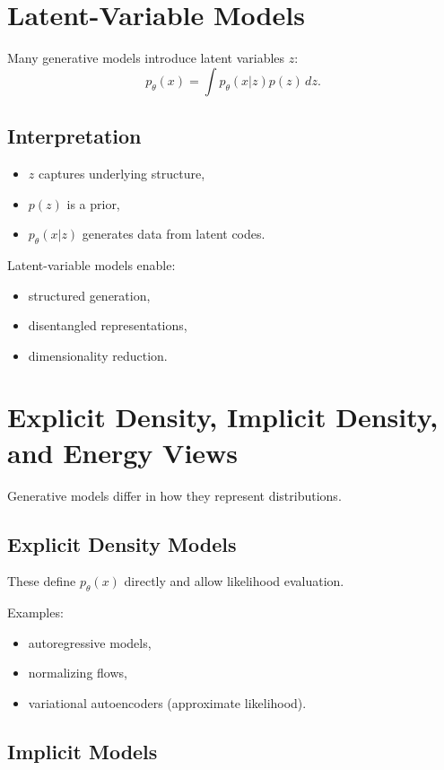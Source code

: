 \section{Latent-Variable Models}

Many generative models introduce latent variables $z$:
\[
p_\theta(x) = \int p_\theta(x|z)p(z)\,dz.
\]

\subsection{Interpretation}

\begin{itemize}
    \item $z$ captures underlying structure,
    \item $p(z)$ is a prior,
    \item $p_\theta(x|z)$ generates data from latent codes.
\end{itemize}

Latent-variable models enable:
\begin{itemize}
    \item structured generation,
    \item disentangled representations,
    \item dimensionality reduction.
\end{itemize}

\section{Explicit Density, Implicit Density, and Energy Views}

Generative models differ in how they represent distributions.

\subsection{Explicit Density Models}

These define $p_\theta(x)$ directly and allow likelihood evaluation.

Examples:
\begin{itemize}
    \item autoregressive models,
    \item normalizing flows,
    \item variational autoencoders (approximate likelihood).
\end{itemize}

\subsection{Implicit Models}

